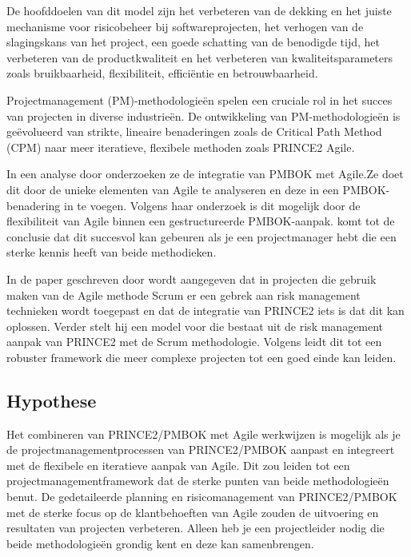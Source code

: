\documentclass[dutch]{hogent-article}
\begin{document}
 De hoofddoelen van dit model zijn het verbeteren van de dekking en het juiste mechanisme voor risicobeheer bij softwareprojecten, het verhogen van de slagingskans van het project, een goede \linebreak schatting  van de benodigde tijd, het verbeteren van de productkwaliteit en het verbeteren van \linebreak kwaliteitsparameters zoals bruikbaarheid, flexibiliteit, efficiëntie en betrouwbaarheid.\autocite{Mousaei2018}
 \newline
 
 Projectmanagement (PM)-methodologieën spelen een cruciale rol in het succes van projecten in diverse industrieën. De ontwikkeling van PM-methodologieën is geëvolueerd van strikte, lineaire benaderingen zoals de Critical Path Method (CPM) naar meer iteratieve, flexibele methoden zoals PRINCE2 Agile.\autocite{Demianchuk2020} 
 \newline

In een analyse door \textcite{Schwalbe2012ManagingAP} onderzoeken ze de integratie van PMBOK met Agile.Ze doet dit door de unieke elementen van Agile te analyseren en deze in een PMBOK-benadering in te voegen.
Volgens haar onderzoek is dit mogelijk door de flexibiliteit van Agile binnen een gestructureerde PMBOK-aanpak.
\textcite{Schwalbe2012ManagingAP} komt tot de conclusie dat dit succesvol kan gebeuren als je een \newline projectmanager hebt die een sterke kennis heeft van beide methodieken.
\newline

In de paper geschreven door \textcite{Tomnek2015ProjectRM} wordt aangegeven dat in projecten die \newline gebruik maken van de Agile methode Scrum er een gebrek aan risk management technieken wordt toegepast en dat de integratie van PRINCE2 iets is dat dit kan oplossen. Verder stelt hij een model voor die bestaat uit de risk management aanpak van PRINCE2 met de Scrum methodologie.
Volgens \textcite{Tomnek2015ProjectRM} leidt dit tot een robuster framework die meer complexe projecten tot een goed einde kan leiden.
\newline
 
\subsection{Hypothese}
\label{sec:hypothese}
Het combineren van PRINCE2/PMBOK met Agile werkwijzen is mogelijk als je de projectmanagementprocessen van PRINCE2/PMBOK
aanpast en integreert met de flexibele en iteratieve aanpak van Agile. Dit zou leiden tot een projectmanagementframework dat de sterke punten van beide methodologieën benut.
De gedetaileerde planning en risicomanagement van PRINCE2/PMBOK met de sterke focus op de klantbehoeften van Agile zouden de uitvoering en resultaten van projecten verbeteren.
Alleen heb je een projectleider nodig die beide methodologieën grondig kent en deze kan samenbrengen.
\end{document}
